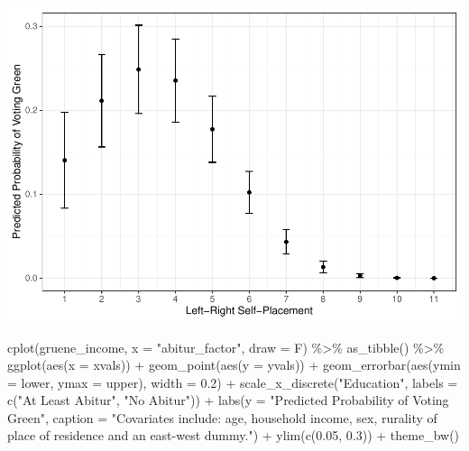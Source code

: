 \documentclass[
]{article}
\newenvironment{Shaded}{\begin{snugshade}}{\end{snugshade}}
\newcommand{\AttributeTok}[1]{\textcolor[rgb]{0.77,0.63,0.00}{#1}}
\newcommand{\FloatTok}[1]{\textcolor[rgb]{0.00,0.00,0.81}{#1}}
\newcommand{\FunctionTok}[1]{\textcolor[rgb]{0.00,0.00,0.00}{#1}}
\newcommand{\NormalTok}[1]{#1}
\newcommand{\SpecialCharTok}[1]{\textcolor[rgb]{0.00,0.00,0.00}{#1}}
\newcommand{\StringTok}[1]{\textcolor[rgb]{0.31,0.60,0.02}{#1}}
\begin{document}
\includegraphics{AVCD_Final_Assignment-Edenhofer_files/figure-latex/gruene-left-right-self-placement-1.pdf}

\begin{Shaded}
\begin{Highlighting}[]
\FunctionTok{cplot}\NormalTok{(gruene\_income, }\AttributeTok{x =} \StringTok{"abitur\_factor"}\NormalTok{, }\AttributeTok{draw =}\NormalTok{ F) }\SpecialCharTok{\%\textgreater{}\%}
  \FunctionTok{as\_tibble}\NormalTok{() }\SpecialCharTok{\%\textgreater{}\%}
  \FunctionTok{ggplot}\NormalTok{(}\FunctionTok{aes}\NormalTok{(}\AttributeTok{x =}\NormalTok{ xvals)) }\SpecialCharTok{+}
  \FunctionTok{geom\_point}\NormalTok{(}\FunctionTok{aes}\NormalTok{(}\AttributeTok{y =}\NormalTok{ yvals)) }\SpecialCharTok{+}
  \FunctionTok{geom\_errorbar}\NormalTok{(}\FunctionTok{aes}\NormalTok{(}\AttributeTok{ymin =}\NormalTok{ lower, }\AttributeTok{ymax =}\NormalTok{ upper), }\AttributeTok{width =} \FloatTok{0.2}\NormalTok{) }\SpecialCharTok{+}
  \FunctionTok{scale\_x\_discrete}\NormalTok{(}\StringTok{"Education"}\NormalTok{, }\AttributeTok{labels =} \FunctionTok{c}\NormalTok{(}\StringTok{"At Least Abitur"}\NormalTok{, }
                                           \StringTok{"No Abitur"}\NormalTok{)) }\SpecialCharTok{+}
  \FunctionTok{labs}\NormalTok{(}\AttributeTok{y =} \StringTok{"Predicted Probability of Voting Green"}\NormalTok{, }
       \AttributeTok{caption =} \StringTok{"Covariates include: age, household income, sex, rurality of place of residence and an east{-}west dummy."}\NormalTok{) }\SpecialCharTok{+}
  \FunctionTok{ylim}\NormalTok{(}\FunctionTok{c}\NormalTok{(}\FloatTok{0.05}\NormalTok{, }\FloatTok{0.3}\NormalTok{)) }\SpecialCharTok{+}
  \FunctionTok{theme\_bw}\NormalTok{()}
\end{Highlighting}
\end{Shaded}
\end{document}
